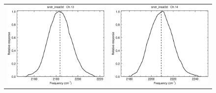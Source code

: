 \begin{figure}[H]
  \centering
  \begin{tabular}{c c}
    \includegraphics[scale=0.35]{graphics/sndr/srf/sndr_insat3d-13.eps} &
    \includegraphics[scale=0.35]{graphics/sndr/srf/sndr_insat3d-14.eps} \\

\end{tabular}
\end{figure}

